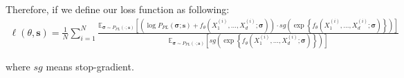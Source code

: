 \documentclass{article}
\begin{document}
Therefore, if we define our loss function as following:
\begin{align}
\ell(\theta, \boldsymbol{s}) = \frac{1}{N}\sum_{i=1}^N \frac{\mathbb{E}_{\boldsymbol{\sigma} \sim P_{PL}(\cdot; \boldsymbol{s})} \left[ \left(\log P_{PL}(\boldsymbol{\sigma};\boldsymbol{s}) + f_\theta\left(X^{(i)}_1, \ldots, X^{(i)}_d; \boldsymbol{\sigma}\right)\right) \cdot sg\left(\exp \left\{ f_\theta\left(X^{(i)}_1, \ldots, X^{(i)}_d; \boldsymbol{\sigma}\right) \right\}\right)\right]}{\mathbb{E}_{\boldsymbol{\sigma} \sim P_{PL}(\cdot; \boldsymbol{s})} \left[ sg \left(\exp \left\{ f_\theta\left(X^{(i)}_1, \ldots, X^{(i)}_d; \boldsymbol{\sigma}\right) \right\}\right)\right]}
\end{align}

where $sg$ means stop-gradient.
\end{document}
